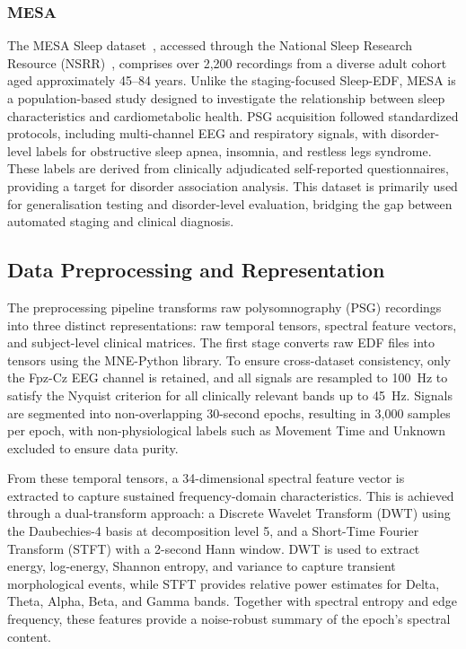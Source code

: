 \subsubsection{MESA}

The MESA Sleep dataset~\cite{mesa}, accessed through the National Sleep Research Resource (NSRR)~\cite{nsrr}, comprises over 2,200 recordings from a diverse adult cohort aged approximately 45--84 years. Unlike the staging-focused Sleep-EDF, MESA is a population-based study designed to investigate the relationship between sleep characteristics and cardiometabolic health. PSG acquisition followed standardized protocols, including multi-channel EEG and respiratory signals, with disorder-level labels for obstructive sleep apnea, insomnia, and restless legs syndrome. These labels are derived from clinically adjudicated self-reported questionnaires, providing a target for disorder association analysis. This dataset is primarily used for generalisation testing and disorder-level evaluation, bridging the gap between automated staging and clinical diagnosis.

\subsection{Data Preprocessing and Representation}

The preprocessing pipeline transforms raw polysomnography (PSG) recordings into three distinct representations: raw temporal tensors, spectral feature vectors, and subject-level clinical matrices. The first stage converts raw EDF files into tensors using the MNE-Python library. To ensure cross-dataset consistency, only the Fpz-Cz EEG channel is retained, and all signals are resampled to 100~Hz to satisfy the Nyquist criterion for all clinically relevant bands up to 45~Hz. Signals are segmented into non-overlapping 30-second epochs, resulting in 3,000 samples per epoch, with non-physiological labels such as Movement Time and Unknown excluded to ensure data purity.

From these temporal tensors, a 34-dimensional spectral feature vector is extracted to capture sustained frequency-domain characteristics. This is achieved through a dual-transform approach: a Discrete Wavelet Transform (DWT) using the Daubechies-4 basis at decomposition level 5, and a Short-Time Fourier Transform (STFT) with a 2-second Hann window. DWT is used to extract energy, log-energy, Shannon entropy, and variance to capture transient morphological events, while STFT provides relative power estimates for Delta, Theta, Alpha, Beta, and Gamma bands. Together with spectral entropy and edge frequency, these features provide a noise-robust summary of the epoch's spectral content.

